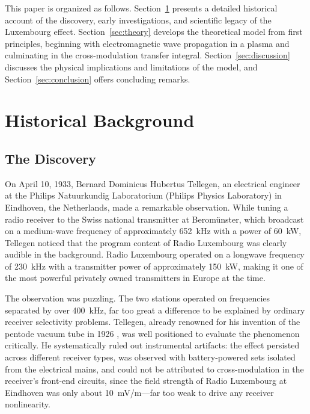 \documentclass[12pt]{article}
\begin{document}
This paper is organized as follows.  Section~\ref{sec:history} presents a detailed
historical account of the discovery, early investigations, and scientific legacy of the
Luxembourg effect.  Section~\ref{sec:theory} develops the theoretical model from first
principles, beginning with electromagnetic wave propagation in a plasma and culminating in
the cross-modulation transfer integral.  Section~\ref{sec:discussion} discusses the
physical implications and limitations of the model, and Section~\ref{sec:conclusion}
offers concluding remarks.

\section{Historical Background}
\label{sec:history}

\subsection{The Discovery}

On April 10, 1933, Bernard Dominicus Hubertus Tellegen, an electrical engineer at the
Philips Natuurkundig Laboratorium (Philips Physics Laboratory) in Eindhoven, the
Netherlands, made a remarkable observation.  While tuning a radio receiver to the Swiss
national transmitter at Berom\"unster, which broadcast on a medium-wave frequency of
approximately 652~kHz with a power of 60~kW, Tellegen noticed that the program content of
Radio Luxembourg was clearly audible in the background.  Radio Luxembourg operated on a
longwave frequency of 230~kHz with a transmitter power of approximately 150~kW, making it
one of the most powerful privately owned transmitters in Europe at the time.

The observation was puzzling.  The two stations operated on frequencies separated by over
400~kHz, far too great a difference to be explained by ordinary receiver selectivity
problems.  Tellegen, already renowned for his invention of the pentode vacuum tube in 1926
\cite{tellegen_bio}, was well positioned to evaluate the phenomenon critically.  He
systematically ruled out instrumental artifacts: the effect persisted across different
receiver types, was observed with battery-powered sets isolated from the electrical mains,
and could not be attributed to cross-modulation in the receiver's front-end circuits,
since the field strength of Radio Luxembourg at Eindhoven was only about 10~mV/m---far too
weak to drive any receiver nonlinearity.
\end{document}
